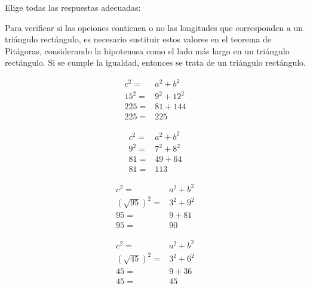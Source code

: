 Elige todas las respuestas adecuadas:

\begin{solutionbox}{4.5cm}
    Para verificar si las opciones contienen o no las longitudes que corresponden a un triángulo rectángulo, es necesario sustituir estos valores en el teorema de Pitágoras, considerando la hipotenusa como el lado más largo en un triángulo rectángulo. Si se cumple la igualdad, entonces se trata de un triángulo rectángulo.

    \vspace{-1cm}
    \begin{multicols}{4}
        \begin{align*}
            c^2=  & a^2+b^2  \\
            15^2= & 9^2+12^2 \\
            225=  & 81+144   \\
            225=  & 225
        \end{align*}

        \begin{align*}
            c^2= & a^2+b^2 \\
            9^2= & 7^2+8^2 \\
            81=  & 49+64   \\
            81=  & 113
        \end{align*}

        \begin{align*}
            c^2=           & a^2+b^2   \\
            (\sqrt{95})^2= & 3^2 + 9^2 \\
            95=            & 9+81      \\
            95=            & 90
        \end{align*}

        \begin{align*}
            c^2=           & a^2+b^2   \\
            (\sqrt{45})^2= & 3^2 + 6^2 \\
            45=            & 9+36      \\
            45=            & 45
        \end{align*}
    \end{multicols}

\end{solutionbox}
